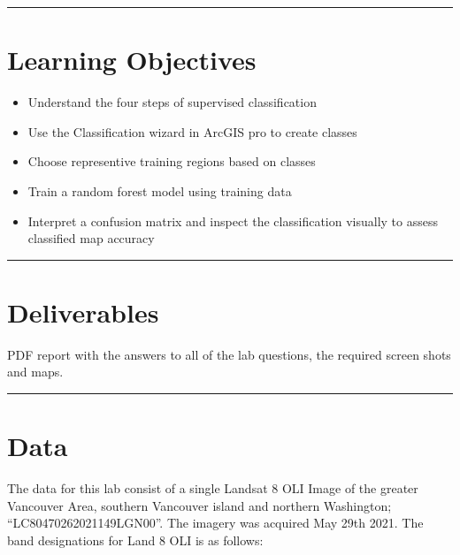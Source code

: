 \documentclass[
]{book}
\providecommand{\tightlist}{%
  \setlength{\itemsep}{0pt}\setlength{\parskip}{0pt}}
\begin{document}
\begin{center}\rule{0.5\linewidth}{0.5pt}\end{center}

\hypertarget{learning-objectives-7}{%
\section*{Learning Objectives}\label{learning-objectives-7}}

\begin{itemize}
\tightlist
\item
  Understand the four steps of supervised classification
\item
  Use the Classification wizard in ArcGIS pro to create classes
\item
  Choose representive training regions based on classes
\item
  Train a random forest model using training data
\item
  Interpret a confusion matrix and inspect the classification visually to assess classified map accuracy
\end{itemize}

\begin{center}\rule{0.5\linewidth}{0.5pt}\end{center}

\hypertarget{lab8-deliverables}{%
\section*{Deliverables}\label{lab8-deliverables}}

PDF report with the answers to all of the lab questions, the required screen shots and maps.

\begin{center}\rule{0.5\linewidth}{0.5pt}\end{center}

\hypertarget{data-5}{%
\section*{Data}\label{data-5}}

The data for this lab consist of a single Landsat 8 OLI Image of the greater Vancouver Area, southern Vancouver island and northern Washington; ``LC80470262021149LGN00''. The imagery was acquired May 29th 2021. The band designations for Land 8 OLI is as follows:
\end{document}
